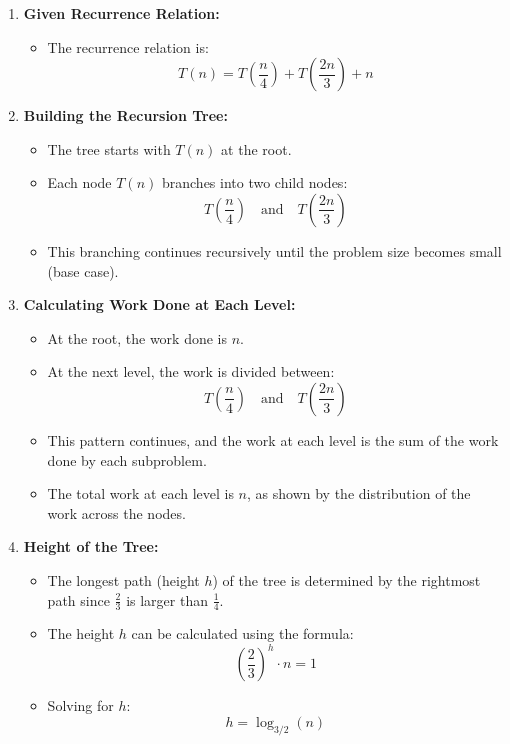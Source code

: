     \begin{example}
        \begin{enumerate}
            \item \textbf{Given Recurrence Relation:}
            \begin{itemize}
                \item The recurrence relation is:
                \[
                T(n) = T\left(\frac{n}{4}\right) + T\left(\frac{2n}{3}\right) + n
                \]
            \end{itemize}
            
            \item \textbf{Building the Recursion Tree:}
            \begin{itemize}
                \item The tree starts with \( T(n) \) at the root.
                \item Each node \( T(n) \) branches into two child nodes:
                \[
                T\left(\frac{n}{4}\right) \quad \text{and} \quad T\left(\frac{2n}{3}\right)
                \]
                \item This branching continues recursively until the problem size becomes small (base case).
            \end{itemize}
            
            \item \textbf{Calculating Work Done at Each Level:}
            \begin{itemize}
                \item At the root, the work done is \( n \).
                \item At the next level, the work is divided between:
                \[
                T\left(\frac{n}{4}\right) \quad \text{and} \quad T\left(\frac{2n}{3}\right)
                \]
                \item This pattern continues, and the work at each level is the sum of the work done by each subproblem.
                \item The total work at each level is \( n \), as shown by the distribution of the work across the nodes.
            \end{itemize}
            
            \item \textbf{Height of the Tree:}
            \begin{itemize}
                \item The longest path (height \( h \)) of the tree is determined by the rightmost path since \( \frac{2}{3} \) is larger than \( \frac{1}{4} \).
                \item The height \( h \) can be calculated using the formula:
                \[
                \left(\frac{2}{3}\right)^h \cdot n = 1
                \]
                \item Solving for \( h \):
                \[
                h = \log_{3/2}(n)
                \]
            \end{itemize}
            

\end{enumerate}
\end{example}
